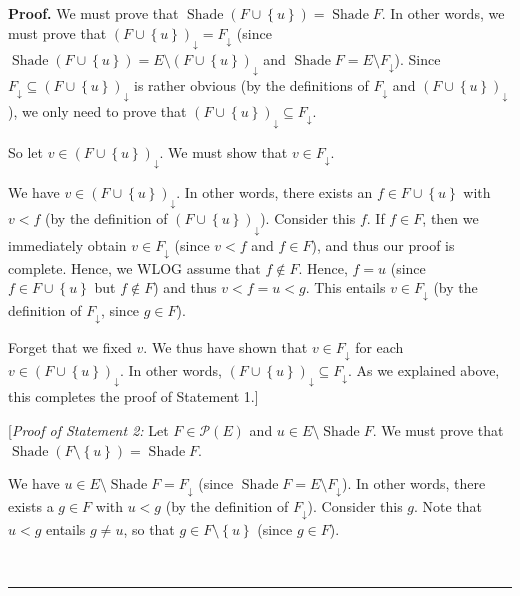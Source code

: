 \documentclass[numbers=enddot,12pt,final,onecolumn]{scrartcl}%
\theoremstyle{definition}
\newenvironment{proof}[1][Proof]{\noindent\textbf{#1.} }{\ \rule{0.5em}{0.5em}}
\newenvironment{verlong}{}{}
\begin{document}
\begin{verlong}
\begin{proof}
We must prove that $\operatorname*{Shade}\left(  F\cup\left\{  u\right\}
\right)  =\operatorname*{Shade}F$. In other words, we must prove that $\left(
F\cup\left\{  u\right\}  \right)  _{\downarrow}=F_{\downarrow}$ (since
$\operatorname*{Shade}\left(  F\cup\left\{  u\right\}  \right)  =E\setminus
\left(  F\cup\left\{  u\right\}  \right)  _{\downarrow}$ and
$\operatorname*{Shade}F=E\setminus F_{\downarrow}$). Since $F_{\downarrow
}\subseteq\left(  F\cup\left\{  u\right\}  \right)  _{\downarrow}$ is rather
obvious (by the definitions of $F_{\downarrow}$ and $\left(  F\cup\left\{
u\right\}  \right)  _{\downarrow}$), we only need to prove that $\left(
F\cup\left\{  u\right\}  \right)  _{\downarrow}\subseteq F_{\downarrow}$.

So let $v\in\left(  F\cup\left\{  u\right\}  \right)  _{\downarrow}$. We must
show that $v\in F_{\downarrow}$.

We have $v\in\left(  F\cup\left\{  u\right\}  \right)  _{\downarrow}$. In
other words, there exists an $f\in F\cup\left\{  u\right\}  $ with $v<f$ (by
the definition of $\left(  F\cup\left\{  u\right\}  \right)  _{\downarrow}$).
Consider this $f$. If $f\in F$, then we immediately obtain $v\in
F_{\downarrow}$ (since $v<f$ and $f\in F$), and thus our proof is complete.
Hence, we WLOG assume that $f\notin F$. Hence, $f=u$ (since $f\in
F\cup\left\{  u\right\}  $ but $f\notin F$) and thus $v<f=u<g$. This entails
$v\in F_{\downarrow}$ (by the definition of $F_{\downarrow}$, since $g\in F$).

Forget that we fixed $v$. We thus have shown that $v\in F_{\downarrow}$ for
each $v\in\left(  F\cup\left\{  u\right\}  \right)  _{\downarrow}$. In other
words, $\left(  F\cup\left\{  u\right\}  \right)  _{\downarrow}\subseteq
F_{\downarrow}$. As we explained above, this completes the proof of Statement 1.]

[\textit{Proof of Statement 2:} Let $F\in\mathcal{P}\left(  E\right)  $ and
$u\in E\setminus\operatorname*{Shade}F$. We must prove that
$\operatorname*{Shade}\left(  F\setminus\left\{  u\right\}  \right)
=\operatorname*{Shade}F$.

We have $u\in E\setminus\operatorname*{Shade}F=F_{\downarrow}$ (since
$\operatorname*{Shade}F=E\setminus F_{\downarrow}$). In other words, there
exists a $g\in F$ with $u<g$ (by the definition of $F_{\downarrow}$). Consider
this $g$. Note that $u<g$ entails $g\neq u$, so that $g\in F\setminus\left\{
u\right\}  $ (since $g\in F$).


\end{proof}
\end{verlong}
\end{document}
